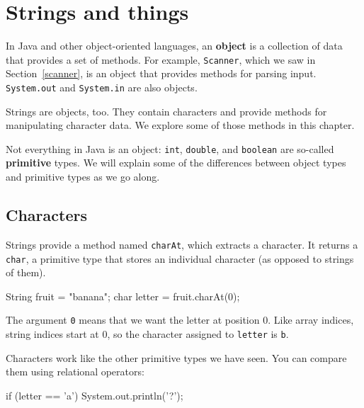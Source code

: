\documentclass[12pt]{book}
\theoremstyle{exercise}
\newcommand{\java}[1]{\verb"#1"}
\begin{document}
\chapter{Strings and things}
\label{strings}


In Java and other object-oriented languages, an {\bf object} is a collection of data that provides a set of methods.
For example, \java{Scanner}, which we saw in Section~\ref{scanner}, is an object that provides methods for parsing input.
\java{System.out} and \java{System.in} are also objects.


Strings are objects, too.
They contain characters and provide methods for manipulating character data.
We explore some of those methods in this chapter.


Not everything in Java is an object: \java{int}, \java{double}, and \java{boolean} are so-called {\bf primitive} types.
We will explain some of the differences between object types and primitive types as we go along.


\section{Characters}


Strings provide a method named \java{charAt}, which extracts a character.
It returns a \java{char}, a primitive type that stores an individual character (as opposed to strings of them).

\begin{code}
    String fruit = "banana";
    char letter = fruit.charAt(0);
\end{code}

The argument \java{0} means that we want the letter at position 0.
Like array indices, string indices start at 0, so the character assigned to \java{letter} is \java{b}.


Characters work like the other primitive types we have seen.
You can compare them using relational operators:

\begin{code}
    if (letter == 'a') {
        System.out.println('?');
    }
\end{code}
\end{document}
